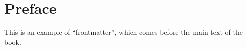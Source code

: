 \chapter{Preface}

This is an example of ``frontmatter'', which comes before the main text of the book.